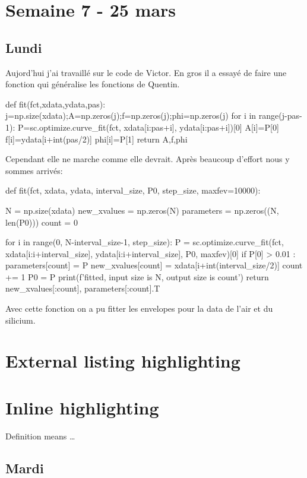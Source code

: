 \section{Semaine 7 - 25 mars}

\subsection{Lundi}

Aujord'hui j'ai travaillé sur le code de Victor. En gros il a
essayé de faire une fonction  qui généralise
les fonctions de Quentin.
\begin{python}
def fit(fct,xdata,ydata,pas):
    j=np.size(xdata);A=np.zeros(j);f=np.zeros(j);phi=np.zeros(j)
    for i in range(j-pas-1):
        P=sc.optimize.curve_fit(fct, xdata[i:pas+i], ydata[i:pas+i])[0]
        A[i]=P[0]
        f[i]=ydata[i+int(pas/2)]
        phi[i]=P[1]
    return A,f,phi
\end{python}
Cependant elle ne marche comme elle devrait. Après beaucoup
d'effort nous y sommes arrivés:
\begin{python}
def fit(fct, xdata, ydata, interval_size, P0, step_size, maxfev=10000):

    N = np.size(xdata)
    new_xvalues = np.zeros(N)
    parameters = np.zeros((N, len(P0)))
    count = 0

    for i in range(0, N-interval_size-1, step_size):
        P = sc.optimize.curve_fit(fct, xdata[i:i+interval_size], ydata[i:i+interval_size], P0, maxfev)[0]
        if P[0] > 0.01 :
            parameters[count] = P
            new_xvalues[count] = xdata[i+int(interval_size/2)]
            count += 1
            P0 = P
    print(f'\nCurve fitted, input size is {N}, output size is {count}')
return  new_xvalues[:count], parameters[:count].T
\end{python}

Avec cette fonction on a pu fitter les envelopes pour la data de l'air et du silicium.

\section{External listing highlighting}


\section{Inline highlighting}

Definition  means \dots

\subsection{Mardi}

